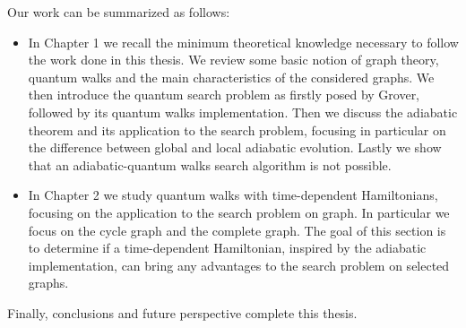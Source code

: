 \noindent
Our work can be summarized as follows:
\begin{itemize}
  \item In Chapter 1  we recall the minimum theoretical knowledge necessary to follow the work done in this thesis. We review some basic notion of graph theory, quantum walks and the main characteristics of the considered graphs. We then introduce the quantum search problem as firstly posed by Grover, followed by its quantum walks implementation. Then we discuss the adiabatic theorem and its application to the search problem, focusing in particular on the difference between global and local adiabatic evolution. Lastly we show that an adiabatic-quantum walks search algorithm is not possible.

  \item In Chapter 2 we study quantum walks with time-dependent Hamiltonians, focusing on the application to the search problem on graph. In particular we focus on the cycle graph and the complete graph. The goal of this section is to determine if a time-dependent Hamiltonian, inspired by the adiabatic implementation, can bring any advantages to the search problem on selected graphs.


\end{itemize}
Finally, conclusions and future perspective complete this thesis.
